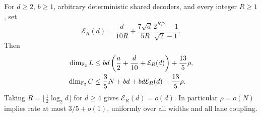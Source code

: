 \begin{theorem}\label{thm:closure-defect}
For $d\ge2$, $b\ge1$, arbitrary deterministic shared decoders, and every
integer $R\ge1$, set
\[
 \mathcal E_R(d)=\frac{d}{10R}+
 \frac{7\sqrt d}{5R}\frac{2^{R/2}-1}{\sqrt2-1}.
\]
Then
\begin{align*}
 \dim_{\mathbb{F}_2}L&\le bd\left(\frac a2+\frac d{10}+\mathcal E_R(d)\right)
                       +\frac{13}5\rho,\\
 \dim_{\mathbb{F}_2}C&\le\frac35N+bd+bd\mathcal E_R(d)+\frac{13}5\rho.
\end{align*}
Taking $R=\lfloor\tfrac12\log_2d\rfloor$ for $d\ge4$ gives
$\mathcal E_R(d)=o(d)$. In particular $\rho=o(N)$ implies rate at most
$3/5+o(1)$, uniformly over all widths and all lane coupling.
\end{theorem}
